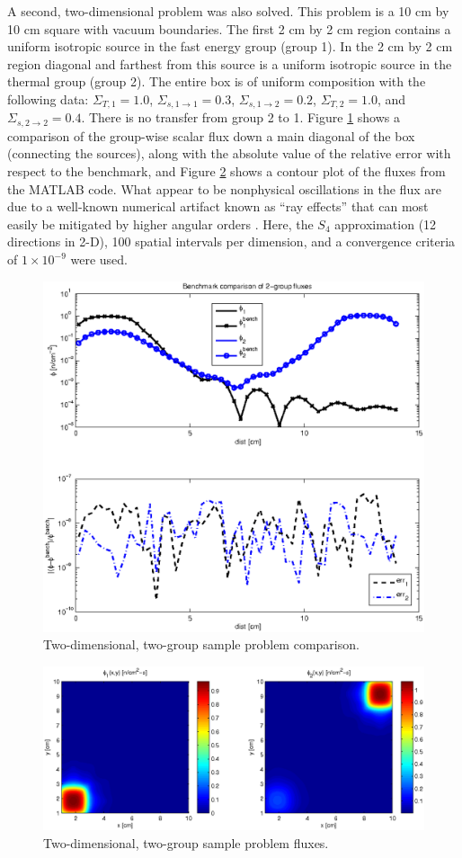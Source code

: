 \documentclass[final,3p,times,11pt]{elsarticle}
\begin{document}
  A second, two-dimensional problem was also solved.  This problem is a 10 cm by 10 cm square with vacuum boundaries.  The first 2 cm by 2 cm region contains a uniform isotropic source in the fast energy group (group 1).  In the 2 cm by 2 cm region diagonal and farthest from this source is a uniform isotropic source in the thermal group (group 2). The entire box is of uniform composition with the following data: $\Sigma_{T,1}=1.0$, $\Sigma_{s,1\to1}=0.3$, $\Sigma_{s,1\to2}=0.2$, $\Sigma_{T,2}=1.0$, and $\Sigma_{s,2\to2}=0.4$.  There is no transfer from group 2 to 1. Figure \ref{fig:two_d_comp} shows a comparison of the group-wise scalar flux down a main diagonal of the box (connecting the sources), along with the absolute value of the relative error with respect to the benchmark, and Figure  \ref{fig:two_d_flux} shows a contour plot of the fluxes from the MATLAB code. What appear to be nonphysical oscillations in the flux are due to a well-known numerical artifact known as ``ray effects'' that can most easily be mitigated by higher angular orders \cite{lewis1993cmn}.  Here, the $S_4$ approximation (12 directions in 2-D), 100 spatial intervals per dimension, and a convergence criteria of $1\times 10^{-9}$ were used.

  \begin{figure}[ht] 
      \centering
      \includegraphics[keepaspectratio, width = 3.5 in]{two_d_comp}
      \caption{Two-dimensional, two-group sample problem comparison.}
      \label{fig:two_d_comp}
  \end{figure}

  \begin{figure}[ht]  
      \centering
      \includegraphics[keepaspectratio, width = 5.0 in]{two_d_flux}
      \caption{Two-dimensional, two-group sample problem fluxes.}
      \label{fig:two_d_flux}
  \end{figure}
\end{document}
